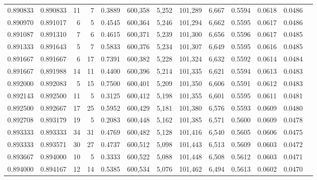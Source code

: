 \begin{tabular}{rrrrrrrrrrrrr}
0.890833 & 0.890833 &    11 &   7 &                                     0.3889 & 600,358 &   5,252 & 101,289 &   6,667 & 0.5594 & 0.0618 & 0.0486 \\
0.890970 & 0.891017 &     6 &   5 &                                     0.4545 & 600,364 &   5,246 & 101,294 &   6,662 & 0.5595 & 0.0617 & 0.0486 \\
0.891087 & 0.891310 &     7 &   6 &                                     0.4615 & 600,371 &   5,239 & 101,300 &   6,656 & 0.5596 & 0.0617 & 0.0485 \\
0.891333 & 0.891643 &     5 &   7 &                                     0.5833 & 600,376 &   5,234 & 101,307 &   6,649 & 0.5595 & 0.0616 & 0.0485 \\
0.891667 & 0.891667 &     6 &  17 &                                     0.7391 & 600,382 &   5,228 & 101,324 &   6,632 & 0.5592 & 0.0614 & 0.0484 \\
0.891667 & 0.891988 &    14 &  11 &                                     0.4400 & 600,396 &   5,214 & 101,335 &   6,621 & 0.5594 & 0.0613 & 0.0483 \\
0.892000 & 0.892083 &     5 &  15 &                                     0.7500 & 600,401 &   5,209 & 101,350 &   6,606 & 0.5591 & 0.0612 & 0.0483 \\
0.892143 & 0.892500 &    11 &   5 &                                     0.3125 & 600,412 &   5,198 & 101,355 &   6,601 & 0.5595 & 0.0611 & 0.0481 \\
0.892500 & 0.892667 &    17 &  25 &                                     0.5952 & 600,429 &   5,181 & 101,380 &   6,576 & 0.5593 & 0.0609 & 0.0480 \\
0.892708 & 0.893179 &    19 &   5 &                                     0.2083 & 600,448 &   5,162 & 101,385 &   6,571 & 0.5600 & 0.0609 & 0.0478 \\
0.893333 & 0.893333 &    34 &  31 &                                     0.4769 & 600,482 &   5,128 & 101,416 &   6,540 & 0.5605 & 0.0606 & 0.0475 \\
0.893333 & 0.893571 &    30 &  27 &                                     0.4737 & 600,512 &   5,098 & 101,443 &   6,513 & 0.5609 & 0.0603 & 0.0472 \\
0.893667 & 0.894000 &    10 &   5 &                                     0.3333 & 600,522 &   5,088 & 101,448 &   6,508 & 0.5612 & 0.0603 & 0.0471 \\
0.894000 & 0.894167 &    12 &  14 &                                     0.5385 & 600,534 &   5,076 & 101,462 &   6,494 & 0.5613 & 0.0602 & 0.0470 \\

\end{tabular}
